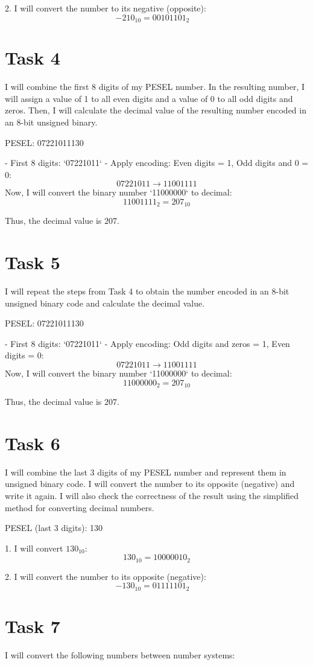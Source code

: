 \documentclass{article}
\begin{document}
2. I will convert the number to its negative (opposite):
   \[
   -210_{10} = 00101101_2 \quad
   \]

\section*{Task 4}
I will combine the first 8 digits of my PESEL number. In the resulting number, I will assign a value of 1 to all even digits and a value of 0 to all odd digits and zeros. Then, I will calculate the decimal value of the resulting number encoded in an 8-bit unsigned binary.

PESEL: 07221011130

- First 8 digits: `07221011`
- Apply encoding: Even digits = 1, Odd digits and 0 = 0:
\[
07221011 \rightarrow 11001111
\]
Now, I will convert the binary number `11000000` to decimal:
\[
11001111_2 = 207_{10}
\]

Thus, the decimal value is \( 207 \).

\section*{Task 5}
I will repeat the steps from Task 4 to obtain the number encoded in an 8-bit unsigned binary code and calculate the decimal value.

PESEL: 07221011130

- First 8 digits: `07221011`
- Apply encoding: Odd digits and zeros = 1, Even digits = 0:
\[
07221011 \rightarrow 11001111
\]
Now, I will convert the binary number `11000000` to decimal:
\[
11000000_2 = 207_{10}
\]

Thus, the decimal value is \( 207 \).

\section*{Task 6}
I will combine the last 3 digits of my PESEL number and represent them in unsigned binary code. I will convert the number to its opposite (negative) and write it again. I will also check the correctness of the result using the simplified method for converting decimal numbers.

PESEL (last 3 digits): 130

1. I will convert \( 130_{10} \):
   \[
   130_{10} = 10000010_2
   \]

2. I will convert the number to its opposite (negative):
   \[
   -130_{10} = 01111101_2 \quad 
   \]

\section*{Task 7}
I will convert the following numbers between number systems:
\end{document}
